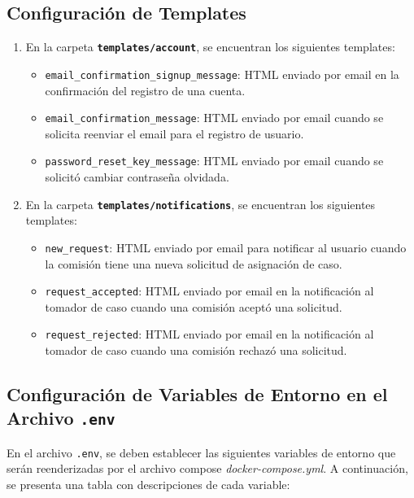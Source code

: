 \subsection{Configuración de Templates}
\begin{enumerate}
    \item En la carpeta \texttt{\textbf{templates/account}}, se encuentran los siguientes templates:

\begin{itemize}
    \item \texttt{email\_confirmation\_signup\_message}: HTML enviado por email en la confirmación del registro de una cuenta.
    \item \texttt{email\_confirmation\_message}: HTML enviado por email cuando se solicita reenviar el email para el registro de usuario.
    \item \texttt{password\_reset\_key\_message}: HTML enviado por email cuando se solicitó cambiar contraseña olvidada.
\end{itemize}


 \item  En la carpeta \texttt{\textbf{templates/notifications}}, se encuentran los siguientes templates:

\begin{itemize}
    \item \texttt{new\_request}: HTML enviado por email para notificar al usuario cuando la comisión tiene una nueva solicitud de asignación de caso.
    \item \texttt{request\_accepted}: HTML enviado por email en la notificación al tomador de caso cuando una comisión aceptó una solicitud.
    \item \texttt{request\_rejected}: HTML enviado por email en la notificación al tomador de caso cuando una comisión rechazó una solicitud.
\end{itemize}


\end{enumerate}



\subsection{Configuración de Variables de Entorno en el Archivo \texttt{.env}}

En el archivo \texttt{.env}, se deben establecer las siguientes variables de entorno que serán reenderizadas por el archivo compose \textit{docker-compose.yml}. A continuación, se presenta una tabla con descripciones de cada variable:

